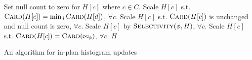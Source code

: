 \newcommand{\InlineIte}[3]{#2\ \textbf{if}\ #1\ \textbf{else}\ #3}
\renewcommand{\algorithmicindent}{1em}

\begin{algorithmic}
  
  \State Set null count to zero for $H[c]$ where $c \in C$.
  \State Scale $H[c]$ s.t. $\Call{Card}{H[c]} = \min_d \Call{Card}{H[d]}$, $\forall c$.
  \State Scale $H[c]$ s.t. $\Call{Card}{H[c]}$ is unchanged and null
  \State count is zero, $\forall c$.
  \State Scale $H[c]$ by $\Call{Selectivity}{\phi, H}$, $\forall c$.
  \State Scale $H[c]$ s.t. $\Call{Card}{H[c]} = \Call{Card}{\bowtie_\phi}$, $\forall c$.
  \EndIf
  \State \Return $H$
  \EndFunction
\end{algorithmic}
\caption{An algorithm for in-plan histogram updates}
\label{algo:histogram-transformation}
  
